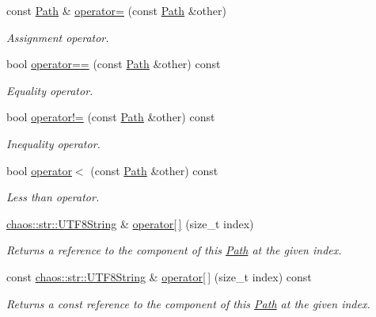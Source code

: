 \begin{DoxyCompactItemize}
const \hyperlink{classchaos_1_1io_1_1file_1_1_path}{Path} \& \hyperlink{classchaos_1_1io_1_1file_1_1_path_aaac3c1980ffcf11566532646ba1a2a65}{operator=} (const \hyperlink{classchaos_1_1io_1_1file_1_1_path}{Path} \&other)
\begin{DoxyCompactList}\small\item\em Assignment operator. \end{DoxyCompactList}\item 
bool \hyperlink{classchaos_1_1io_1_1file_1_1_path_a68c97c43113acbc525498c97e8a1d64d}{operator==} (const \hyperlink{classchaos_1_1io_1_1file_1_1_path}{Path} \&other) const 
\begin{DoxyCompactList}\small\item\em Equality operator. \end{DoxyCompactList}\item 
bool \hyperlink{classchaos_1_1io_1_1file_1_1_path_a6aedff03f22270cdcfb9456ec6864fdd}{operator!=} (const \hyperlink{classchaos_1_1io_1_1file_1_1_path}{Path} \&other) const 
\begin{DoxyCompactList}\small\item\em Inequality operator. \end{DoxyCompactList}\item 
bool \hyperlink{classchaos_1_1io_1_1file_1_1_path_a75296f65ccebe075504744bb01218ac9}{operator$<$} (const \hyperlink{classchaos_1_1io_1_1file_1_1_path}{Path} \&other) const 
\begin{DoxyCompactList}\small\item\em Less than operator. \end{DoxyCompactList}\item 
\hyperlink{classchaos_1_1str_1_1_u_t_f8_string}{chaos\+::str\+::\+U\+T\+F8\+String} \& \hyperlink{classchaos_1_1io_1_1file_1_1_path_a5bdb98733f0961e8dd798904fad1dbbf}{operator\mbox{[}$\,$\mbox{]}} (size\+\_\+t index)
\begin{DoxyCompactList}\small\item\em Returns a reference to the component of this \hyperlink{classchaos_1_1io_1_1file_1_1_path}{Path} at the given index. \end{DoxyCompactList}\item 
const \hyperlink{classchaos_1_1str_1_1_u_t_f8_string}{chaos\+::str\+::\+U\+T\+F8\+String} \& \hyperlink{classchaos_1_1io_1_1file_1_1_path_ade01a60714a2206c6c46ab5a635b6c42}{operator\mbox{[}$\,$\mbox{]}} (size\+\_\+t index) const 
\begin{DoxyCompactList}\small\item\em Returns a const reference to the component of this \hyperlink{classchaos_1_1io_1_1file_1_1_path}{Path} at the given index. \end{DoxyCompactList}\item 

\end{DoxyCompactItemize}
